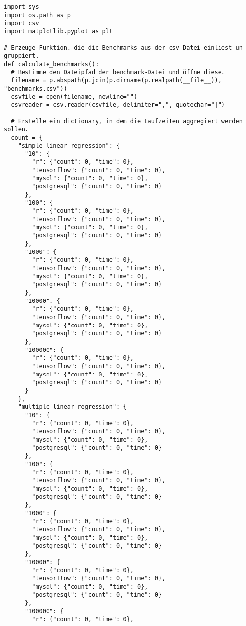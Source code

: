 \begin{verbatim}
import sys
import os.path as p
import csv
import matplotlib.pyplot as plt

# Erzeuge Funktion, die die Benchmarks aus der csv-Datei einliest un gruppiert.
def calculate_benchmarks():
  # Bestimme den Dateipfad der benchmark-Datei und öffne diese.
  filename = p.abspath(p.join(p.dirname(p.realpath(__file__)), "benchmarks.csv"))
  csvfile = open(filename, newline="")
  csvreader = csv.reader(csvfile, delimiter=",", quotechar="|")

  # Erstelle ein dictionary, in dem die Laufzeiten aggregiert werden sollen.
  count = {
    "simple linear regression": {
      "10": {
        "r": {"count": 0, "time": 0},
        "tensorflow": {"count": 0, "time": 0},
        "mysql": {"count": 0, "time": 0},
        "postgresql": {"count": 0, "time": 0}
      },
      "100": {
        "r": {"count": 0, "time": 0},
        "tensorflow": {"count": 0, "time": 0},
        "mysql": {"count": 0, "time": 0},
        "postgresql": {"count": 0, "time": 0}
      },
      "1000": {
        "r": {"count": 0, "time": 0},
        "tensorflow": {"count": 0, "time": 0},
        "mysql": {"count": 0, "time": 0},
        "postgresql": {"count": 0, "time": 0}
      },
      "10000": {
        "r": {"count": 0, "time": 0},
        "tensorflow": {"count": 0, "time": 0},
        "mysql": {"count": 0, "time": 0},
        "postgresql": {"count": 0, "time": 0}
      },
      "100000": {
        "r": {"count": 0, "time": 0},
        "tensorflow": {"count": 0, "time": 0},
        "mysql": {"count": 0, "time": 0},
        "postgresql": {"count": 0, "time": 0}
      }
    },
    "multiple linear regression": {
      "10": {
        "r": {"count": 0, "time": 0},
        "tensorflow": {"count": 0, "time": 0},
        "mysql": {"count": 0, "time": 0},
        "postgresql": {"count": 0, "time": 0}
      },
      "100": {
        "r": {"count": 0, "time": 0},
        "tensorflow": {"count": 0, "time": 0},
        "mysql": {"count": 0, "time": 0},
        "postgresql": {"count": 0, "time": 0}
      },
      "1000": {
        "r": {"count": 0, "time": 0},
        "tensorflow": {"count": 0, "time": 0},
        "mysql": {"count": 0, "time": 0},
        "postgresql": {"count": 0, "time": 0}
      },
      "10000": {
        "r": {"count": 0, "time": 0},
        "tensorflow": {"count": 0, "time": 0},
        "mysql": {"count": 0, "time": 0},
        "postgresql": {"count": 0, "time": 0}
      },
      "100000": {
        "r": {"count": 0, "time": 0},

\end{verbatim}
